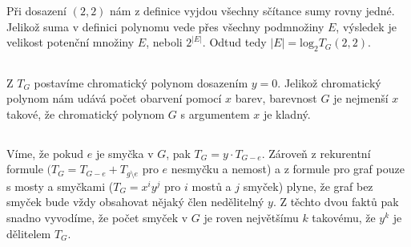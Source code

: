 \documentclass{scrartcl}
\begin{document}
    \section{}
    \section{}
    \subsection{}
    Při dosazení $(2,2)$ nám z definice vyjdou všechny sčítance sumy rovny jedné. Jelikož suma v definici polynomu vede přes všechny podmnožiny $E$, výsledek je velikost potenční množiny $E$, neboli $2^{\vert E \vert}$. Odtud tedy $\vert E \vert = \text{log}_2 T_G(2,2)$.

    \subsection{}
    Z $T_G$ postavíme chromatický polynom dosazením $y = 0$. Jelikož chromatický polynom nám udává počet obarvení pomocí $x$ barev, barevnost $G$ je nejmenší $x$ takové, že chromatický polynom $G$ s argumentem $x$ je kladný.

    \subsection{}
    Víme, že pokud $e$ je smyčka v $G$, pak $T_G = y \cdot T_{G-e}$. Zároveň z rekurentní formule $(T_G = T_{G-e} + T_{g\setminus e}$ pro $e$ nesmyčku a nemost) a z formule pro graf pouze s mosty a smyčkami ($T_G = x^iy^j$ pro $i$ mostů a $j$ smyček) plyne, že graf bez smyček bude vždy obsahovat nějaký člen nedělitelný $y$. Z těchto dvou faktů pak snadno vyvodíme, že počet smyček v $G$ je roven největšímu $k$ takovému, že $y^k$ je dělitelem $T_G$. 
    
\end{document}

